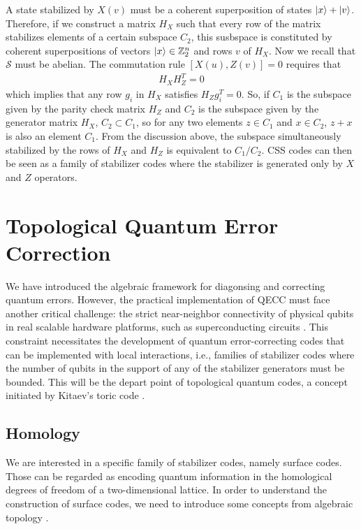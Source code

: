 \documentclass[12pt, twoside, openany]{book}
\begin{document}
A state stabilized by $X(v)$ must be a coherent superposition of states $\ket{x} + \ket{v}$. Therefore, if we construct a matrix $H_X$ such that every row of the matrix stabilizes elements of a certain subspace $C_2$, this susbspace is constituted by coherent superpositions of vectors $\ket{x} \in \mathbb{Z}^n_2$ and rows $v$ of $H_X$. Now we recall that $\mathcal{S}$ must be abelian. The commutation rule $[X(u),Z(v)] = 0$ requires that 
\begin{align} \label{commutationCSS}
    H_X H_Z^T = 0
\end{align}
which implies that any row $g_i$ in $H_X$ satisfies $H_Z g_i^T = 0$. So, if $C_1$ is the subspace given by the parity check matrix $H_Z$ and $C_2$ is the subspace given by the generator matrix $H_X$, $C_2 \subset C_1$, so for any two elements $z \in C_1$ and $x \in C_2$, $z+x$ is also an element $C_1$. From the discussion above, the subspace simultaneously stabilized by the rows of $H_X$ and $H_Z$ is equivalent to $C_1 / C_2$. CSS codes can then be seen as a family of stabilizer codes where the stabilizer is generated only by $X$ and $Z$ operators. 

\chapter{Topological Quantum Error Correction}

We have introduced the algebraic framework for diagonsing and correcting quantum errors. However, the practical implementation of QECC must face another critical challenge: the strict near-neighbor connectivity of physical qubits in real scalable hardware platforms, such as superconducting circuits \cite{QuantumSupremacy2019} \cite{Het_nyi_2024}. This constraint necessitates the development of quantum error-correcting codes that can be implemented with local interactions, i.e., families of stabilizer codes where the number of qubits in the support of any of the stabilizer generators must be bounded. This will be the depart point of topological quantum codes, a concept initiated by Kitaev's toric code \cite{Kitaev2003}.\\

\section{Homology}

We are interested in a specific family of stabilizer codes, namely surface codes. Those can be regarded as encoding quantum information in the homological degrees of freedom of a two-dimensional lattice. In order to understand the construction of surface codes, we need to introduce some concepts from algebraic topology \cite{bombin2013introductiontopologicalquantumcodes}. 
\end{document}
